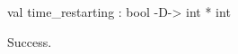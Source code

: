 \chklistingtrue
{}
\begin{ChkListingMsg}
val time_restarting : bool -D-> int * int
\end{ChkListingMsg}
\begin{ChkListingErr}
Success.
\end{ChkListingErr}
